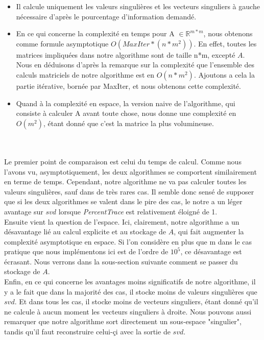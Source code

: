 \documentclass[a4paper,12pt]{article}
\begin{document}
        \begin{itemize}
            \item Il calcule uniquement les valeurs singulières et les vecteurs singuliers à gauche nécessaire d'après le pourcentage d'information demandé.
            \item En ce qui concerne la complexité en temps pour A $\in \mathbb{R}^{m*m}$, nous obtenons comme formule asymptotique $O(MaxIter*(n*m^2))$. En effet, toutes les matrices impliquées dans notre algorithme sont de taille n*m, excepté $A$. Nous en déduisons d'après la remarque sur la complexité que l'ensemble des calculs matriciels de notre algorithme est en $O(n*m^2)$. Ajoutons a cela la partie itérative, bornée par MaxIter, et nous obtenons cette complexité.
            \item Quand à la complexité en espace, la version naive de l'algorithme, qui consiste à calculer A avant toute chose, nous donne une complexité en $O(m^2)$, étant donné que c'est la matrice la plus volumineuse.
        \end{itemize}
\bigskip
\ \\
\ \\
    Le premier point de comparaison est celui du temps de calcul. Comme nous l'avons vu, asymptotiquement, les deux algorithmes se comportent similairement en terme de temps. Cependant, notre algorithme ne va pas calculer toutes les valeurs singulières, sauf dans de très rares cas. Il semble donc sensé de supposer que si les deux algorithmes se valent dans le pire des cas, le notre a un léger avantage sur $svd$ lorsque \textit{PercentTrace} est relativement éloigné de 1. \\

    Ensuite vient la question de l'espace. Ici, clairement, notre algorithme a un désavantage lié au calcul explicite et au stockage de $A$, qui fait augmenter la complexité asymptotique en espace. Si l'on considère en plus que m dans le cas pratique que nous implémentons ici est de l'ordre de $10^5$, ce désavantage est écrasant. Nous verrons dans la sous-section suivante comment se passer du stockage de $A$. \\

    Enfin, en ce qui concerne les avantages moins significatifs de notre algorithme, il y a le fait que dans la majorité des cas, il stocke moins de valeurs singulières que $svd$. Et dans tous les cas, il stocke moins de vecteurs singuliers, étant donné qu'il ne calcule à aucun moment les vecteurs singuliers à droite. Nous pouvons aussi remarquer que notre algorithme sort directement un sous-espace "singulier", tandis qu'il faut reconstruire celui-çi avec la sortie de $svd$.
\end{document}
